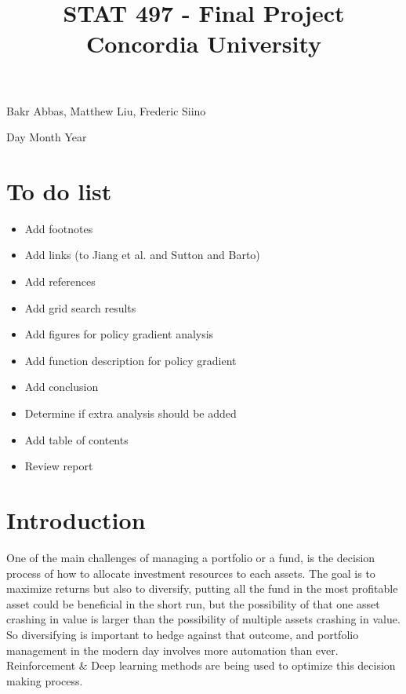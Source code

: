 \documentclass[a4paper,12pt]{article}
\title{
{STAT 497 - Final Project} \\
{\large Concordia University} \\
}
\date{}
\begin{document}
\begin{titlingpage}
  \maketitle
  \centering
  \vfill
  {\large{Bakr Abbas, Matthew Liu, Frederic Siino}} \par
  {\large{Day Month Year}}
\end{titlingpage}

\newpage

\section{To do list}

\begin{itemize}
  \item Add footnotes
  \item Add links (to Jiang et al. and Sutton and Barto)
  \item Add references
  \item Add grid search results
  \item Add figures for policy gradient analysis
  \item Add function description for policy gradient
  \item Add conclusion
  \item Determine if extra analysis should be added
  \item Add table of contents
  \item Review report
\end{itemize}

\newpage

\section{Introduction}
One of the main challenges of managing a portfolio or a fund, is the decision process of how to allocate investment resources to each assets. The goal is to maximize returns but also to diversify, putting all the fund in the most profitable asset could be beneficial in the short run, but the possibility of that one asset crashing in value is larger than the possibility of multiple assets crashing in value. So diversifying is important to hedge against that outcome, and portfolio management in the modern day involves more automation than ever. Reinforcement \& Deep learning methods are being used to optimize this decision making process. \\
\end{document}

